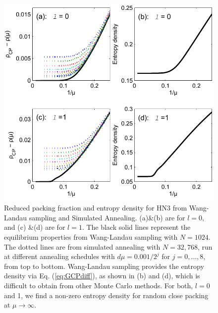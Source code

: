 \begin{figure}
\centering \includegraphics[width=1\columnwidth]{Chapter-2/Paper_HN3_PackMu_Entropy_l01_Plot}
\protect\caption{Reduced packing fraction and entropy density for HN3 from Wang-Landau
sampling and Simulated Annealing. (a)\&(b) are for $l=0$, and (c)
\&(d) are for $l=1$. The black solid lines represent the equilibrium
properties from Wang-Landau sampling with $N=1024$. The dotted lines
are from simulated annealing with $N=32,768$, run at different annealing
schedules with $d\mu=0.001/2^{j}$ for $j=0,\ldots,8$, from top to
bottom. Wang-Landau sampling provides the entropy density via Eq.
(\ref{eq:GCPdiff}), as shown in (b) and (d), which is difficult to
obtain from other Monte Carlo methods. For both, $l=0$ and 1, we
find a non-zero entropy density for random close packing at $\mu\rightarrow\infty$.}
\label{fig:HN3PE} 
\end{figure}


